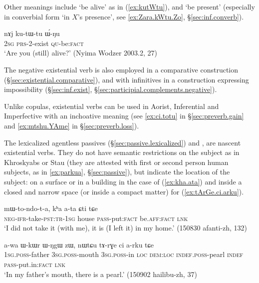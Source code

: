 Other meanings include `be alive' as in (\ref{ex:kutWtu}), and `be present' (especially in converbial form  `in $X$'s presence', see \ref{ex:Zara.kWtu.Zo}, §\ref{sec:inf.converb}). 

\begin{exe}
\ex \label{ex:kutWtu}
\gll  nɤj ku-tɯ-tu ɯ́-ŋu \\
\textsc{2sg} \textsc{prs}-2-exist \textsc{qu}-be:\textsc{fact} \\
\glt `Are you (still) alive?' (Nyima Wodzer 2003.2, 27)
\end{exe} 

The negative existential verb  is also employed in a comparative construction (§\ref{sec:existential.comparative}), and with infinitives in a construction expressing impossibility (§\ref{sec:inf.exist}, §\ref{sec:participial.complements.negative}).

Unlike copulas, existential verbs can be used in Aorist, Inferential and Imperfective with an inchoative meaning (see  \ref{ex:ci.totu} in §\ref{sec:preverb.gain} and \ref{ex:mtshu.YAme} in §\ref{sec:preverb.loss}).
 
The lexicalized agentless passives (§\ref{sec:passive.lexicalized})   and , are nascent existential verbs. They do not have semantic restrictions on the subject as in Khroskyabs or Stau (they are attested with first or second person human subjects, as in \ref{ex:parkua}, §\ref{sec:passive}), but indicate the location of the subject: on a surface or in a building in the case of  (\ref{ex:kha.ata}) and inside a closed and narrow space (or inside a compact matter) for  (\ref{ex:tArGe.ci.arku}).
 
\begin{exe}
\ex \label{ex:kha.ata}
\gll  mɯ-to-ndo-t-a,  kʰa a-ta ɕti tɕe \\
\textsc{neg}-\textsc{ifr}-take-\textsc{pst}:\textsc{tr}-\textsc{1sg} house \textsc{pass}-put:\textsc{fact} be.\textsc{aff}:\textsc{fact} \textsc{lnk} \\
\glt `I did not take it (with me), it is (I left it) in my home.' (150830 afanti-zh, 132)
  \end{exe}
  
\begin{exe}
\ex \label{ex:tArGe.ci.arku}
\gll a-wa ɯ-kɯr ɯ-ŋgɯ zɯ, nɯtɕu tɤ-rɣe ci a-rku tɕe \\
\textsc{1sg}.\textsc{poss}-father \textsc{3sg}.\textsc{poss}-mouth \textsc{3sg}.\textsc{poss}-in \textsc{loc} \textsc{dem}:\textsc{loc} \textsc{indef}.\textsc{poss}-pearl \textsc{indef} \textsc{pass}-put.in:\textsc{fact} \textsc{lnk} \\
\glt `In my father's mouth, there is a pearl.' (150902 hailibu-zh, 37)
  \end{exe}

